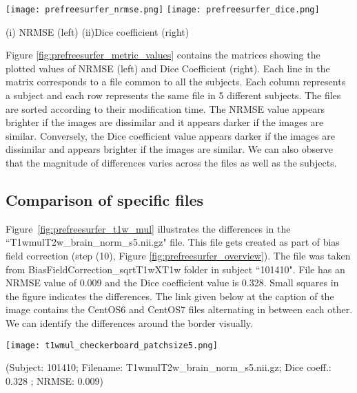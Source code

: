 \begin{center}
\texttt{[image: prefreesurfer\_nrmse.png]}%
\texttt{[image: prefreesurfer\_dice.png]}
\caption*{(i) NRMSE (left) (ii)Dice coefficient (right)}
\label{fig:prefreesurfer_metric_values}
\end{center}

Figure \ref{fig:prefreesurfer_metric_values} contains the matrices showing the plotted values of NRMSE (left) and Dice Coefficient (right).
Each line in the matrix corresponds to a file common to all the subjects.
Each column represents a subject and each row represents the same file in 5 different subjects. The files are sorted according to their modification time.
The NRMSE value appears brighter if the images are dissimilar and it appears darker if the images are similar. Conversely, the Dice coefficient value appears darker if the images are dissimilar and appears brighter if the images are similar. We can also observe that the magnitude of differences varies across the files as well as the subjects.

\subsection{Comparison of specific files}
Figure~\ref{fig:prefreesurfer_t1w_mul} illustrates the differences in the ``T1wmulT2w\_brain\_norm\_s5.nii.gz" file. This file gets created as part of bias field correction (step (10), Figure \ref{fig:prefreesurfer_overview}). The file was taken from BiasFieldCorrection\_sqrtT1wXT1w folder in subject ``101410". File has an NRMSE value of 0.009 and the Dice coefficient value is 0.328. Small squares in the figure indicates the differences.
The link given below at the caption of the image contains the CentOS6 and CentOS7 files alternating in between each other. We can identify the differences around the border visually.

\begin{center}
\texttt{[image: t1wmul\_checkerboard\_patchsize5.png]}
\caption*{(Subject: 101410; Filename: T1wmulT2w\_brain\_norm\_s5.nii.gz; Dice coeff.: 0.328 ; NRMSE: 0.009)}
\label{fig:prefreesurfer_t1w_mul}
\end{center}

